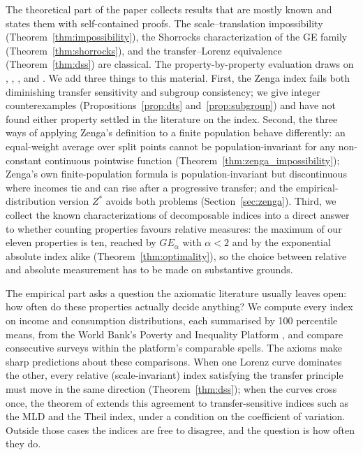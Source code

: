 \documentclass[12pt]{article}
\theoremstyle{plain}
\theoremstyle{definition}
\theoremstyle{remark}
\begin{document}
The theoretical part of the paper collects results that are mostly known and states them with self-contained proofs.
The scale--translation impossibility (Theorem~\ref{thm:impossibility}), the Shorrocks characterization of the GE family (Theorem~\ref{thm:shorrocks}), and the transfer--Lorenz equivalence (Theorem~\ref{thm:dss}) are classical.
The property-by-property evaluation draws on \citet{Atkinson1970}, \citet{Cowell1977}, \citet{Shorrocks1980}, and \citet{Shorrocks1987}.
We add three things to this material.
First, the Zenga index \citep{Zenga2007} fails both diminishing transfer sensitivity and subgroup consistency; we give integer counterexamples (Propositions~\ref{prop:dts} and~\ref{prop:subgroup}) and have not found either property settled in the literature on the index.
Second, the three ways of applying Zenga's definition to a finite population behave differently: an equal-weight average over split points cannot be population-invariant for any non-constant continuous pointwise function (Theorem~\ref{thm:zenga_impossibility}); Zenga's own finite-population formula is population-invariant but discontinuous where incomes tie and can rise after a progressive transfer; and the empirical-distribution version $Z^*$ avoids both problems (Section~\ref{sec:zenga}).
Third, we collect the known characterizations of decomposable indices \citep{Shorrocks1980,Chakravarty1998,Bosmans2010} into a direct answer to whether counting properties favours relative measures: the maximum of our eleven properties is ten, reached by $GE_\alpha$ with $\alpha < 2$ and by the exponential absolute index alike (Theorem~\ref{thm:optimality}), so the choice between relative and absolute measurement has to be made on substantive grounds.

The empirical part asks a question the axiomatic literature usually leaves open: how often do these properties actually decide anything?
We compute every index on \PipDistributions{} income and consumption distributions, each summarised by 100 percentile means, from the World Bank's Poverty and Inequality Platform \citep[PIP;][]{WorldBankPIP2026}, and compare consecutive surveys within the platform's comparable spells.
The axioms make sharp predictions about these comparisons.
When one Lorenz curve dominates the other, every relative (scale-invariant) index satisfying the transfer principle must move in the same direction (Theorem~\ref{thm:dss}); when the curves cross once, the theorem of \citet{Shorrocks1987} extends this agreement to transfer-sensitive indices such as the MLD and the Theil index, under a condition on the coefficient of variation.
Outside those cases the indices are free to disagree, and the question is how often they do.
\end{document}
